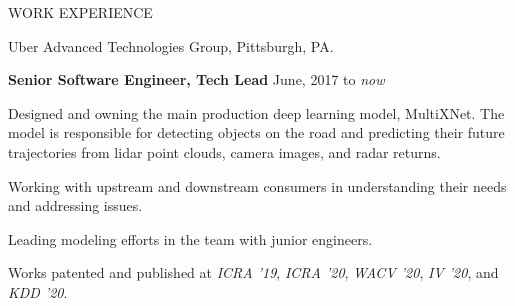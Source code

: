 \documentclass{resume} %
\begin{document}

\begin{rSection}{WORK EXPERIENCE}

\begin{rSubsection}{\hspace{-1em} Uber Advanced Technologies Group, Pittsburgh, PA.}{}{}{}
\vspace{-0.3em}
\item[] \hspace{-2em} {\bf Senior Software Engineer, Tech Lead} \hfill June, 2017 to \emph{now}
\item Designed and owning the main production deep learning model, MultiXNet. The model is responsible for detecting objects on the road and predicting their future trajectories from lidar point clouds, camera images, and radar returns.
\item Working with upstream and downstream consumers in understanding their needs and addressing issues.
\item Leading modeling efforts in the team with junior engineers.
\item Works patented and published at \emph{ICRA '19}, \emph{ICRA '20}, \emph{WACV '20}, \emph{IV '20}, and \emph{KDD '20}.
\end{rSubsection}
\end{rSection}
\end{document}
